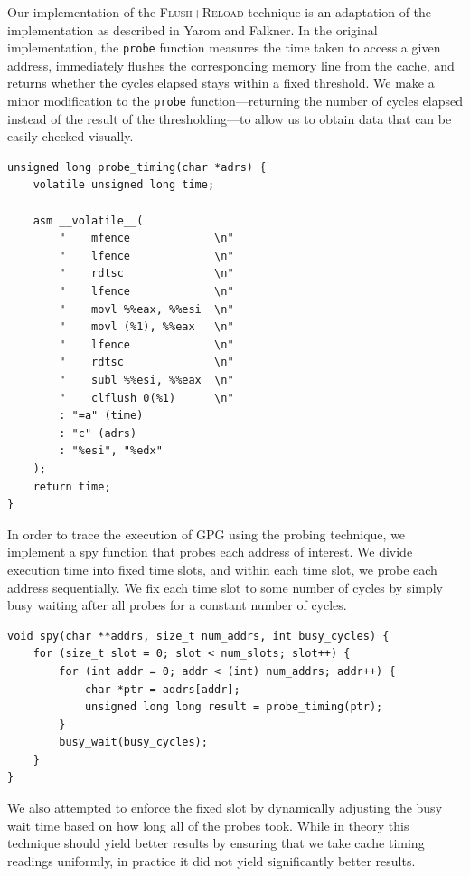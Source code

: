 \documentclass[11pt]{llncs}
\newcommand{\flushreload}{\textsc{Flush}+\textsc{Reload}}
\begin{document}
Our implementation of the \flushreload{} technique is an adaptation of the
implementation as described in Yarom and Falkner\cite{YF13}. In the original
implementation, the \texttt{probe} function measures the time taken to access a
given address, immediately flushes the corresponding memory line from the cache,
and returns whether the cycles elapsed stays within a fixed threshold.  We make
a minor modification to the \texttt{probe} function---returning the number of
cycles elapsed instead of the result of the thresholding---to allow us to obtain
data that can be easily checked visually.

\begin{lstlisting}[caption={Our trivially modified probe function}]
unsigned long probe_timing(char *adrs) {
    volatile unsigned long time;

    asm __volatile__(
        "    mfence             \n"
        "    lfence             \n"
        "    rdtsc              \n"
        "    lfence             \n"
        "    movl %%eax, %%esi  \n"
        "    movl (%1), %%eax   \n"
        "    lfence             \n"
        "    rdtsc              \n"
        "    subl %%esi, %%eax  \n"
        "    clflush 0(%1)      \n"
        : "=a" (time)
        : "c" (adrs)
        : "%esi", "%edx"
    );
    return time;
}
\end{lstlisting}

In order to trace the execution of GPG using the probing technique, we implement
a spy function that probes each address of interest. We divide execution time
into fixed time slots, and within each time slot, we probe each address
sequentially. We fix each time slot to some number of cycles by simply busy
waiting after all probes for a constant number of cycles.

\begin{lstlisting}[caption={Our spy function. Some minor details removed for
                            brevity}]
void spy(char **addrs, size_t num_addrs, int busy_cycles) {
    for (size_t slot = 0; slot < num_slots; slot++) {
        for (int addr = 0; addr < (int) num_addrs; addr++) {
            char *ptr = addrs[addr];
            unsigned long long result = probe_timing(ptr);
        }
        busy_wait(busy_cycles);
    }
}
\end{lstlisting}

We also attempted to enforce the fixed slot by dynamically adjusting the busy
wait time based on how long all of the probes took. While in theory this
technique should yield better results by ensuring that we take cache timing
readings uniformly, in practice it did not yield significantly better
results.
\end{document}

